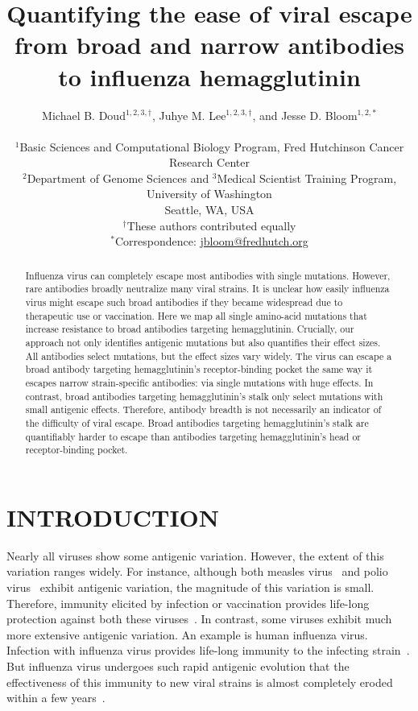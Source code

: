 \documentclass[11pt]{article}
\title{Quantifying the ease of viral escape from broad and narrow antibodies to influenza hemagglutinin}
\author
{Michael B. Doud$^{1,2,3,\dagger}$, Juhye M. Lee$^{1,2,3,\dagger}$, and Jesse D. Bloom$^{1,2,*}$\\
\\
\scriptsize{$^1$Basic Sciences and Computational Biology Program, Fred Hutchinson Cancer Research Center}\\
\scriptsize{$^2$Department of Genome Sciences and $^3$Medical Scientist Training Program, University of Washington} \\
\scriptsize{Seattle, WA, USA} \\
\scriptsize{$^{\dagger}$These authors contributed equally} \\
\scriptsize{$^*$Correspondence: \href{jbloom@fredhutch.org}{jbloom@fredhutch.org}}
}
\date{}
\begin{document}
\maketitle
\onehalfspacing

\begin{abstract}
Influenza virus can completely escape most antibodies with single mutations.
However, rare antibodies broadly neutralize many viral strains.
It is unclear how easily influenza virus might escape such broad antibodies if they became widespread due to therapeutic use or vaccination.
Here we map all single amino-acid mutations that increase resistance to broad antibodies targeting hemagglutinin.
Crucially, our approach not only identifies antigenic mutations but also quantifies their effect sizes.
All antibodies select mutations, but the effect sizes vary widely. 
The virus can escape a broad antibody targeting hemagglutinin's receptor-binding pocket the same way it escapes narrow strain-specific antibodies: via single mutations with huge effects.   
In contrast, broad antibodies targeting hemagglutinin's stalk only select mutations with small antigenic effects. 
Therefore, antibody breadth is not necessarily an indicator of the difficulty of viral escape.
Broad antibodies targeting hemagglutinin's stalk are quantifiably harder to escape than antibodies targeting hemagglutinin's head or receptor-binding pocket.
\end{abstract}

\section*{INTRODUCTION}
Nearly all viruses show some antigenic variation.
However, the extent of this variation ranges widely.
For instance, although both measles virus~\citep{birrer1981antigenic,ter1981antigenic} and polio virus~\citep{crainic1983natural,diamond1985antigenic,drexler2014robustness} exhibit antigenic variation, the magnitude of this variation is small. 
Therefore, immunity elicited by infection or vaccination provides life-long protection against both these viruses~\citep{?}.
In contrast, some viruses exhibit much more extensive antigenic variation.
An example is human influenza virus.
Infection with influenza virus provides life-long immunity to the infecting strain~\citep{?}.
But influenza virus undergoes such rapid antigenic evolution that the effectiveness of this immunity to new viral strains is almost completely eroded within a few years~\citep{?}. 
\end{document}
